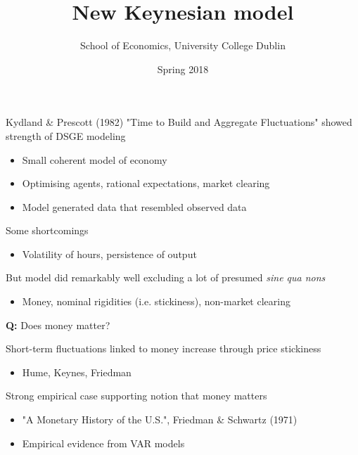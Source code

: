 \documentclass{beamer}
\title{New Keynesian model}
\author{School of Economics, University College Dublin}
\date{Spring 2018}
\begin{document}
\begin{frame}
 \titlepage
\end{frame}

\begin{frame}
  Kydland \& Prescott (1982) "Time to Build and Aggregate Fluctuations" showed strength of DSGE modeling
  \begin{itemize}
    \item Small coherent model of economy
    \item Optimising agents, rational expectations, market clearing
    \item Model generated data that resembled observed data
  \end{itemize}
  \medskip
  Some shortcomings
  \begin{itemize}
    \item Volatility of hours, persistence of output    
  \end{itemize}
  \medskip
  But model did remarkably well excluding a lot of presumed \textit{sine qua nons}
  \begin{itemize}
    \item Money, nominal rigidities (i.e. stickiness), non-market clearing
  \end{itemize}
\end{frame}

\begin{frame}
  \textbf{Q:} Does money matter?
\end{frame}

\begin{frame}
  Short-term fluctuations linked to money increase through price stickiness 
  \begin{itemize}
    \item Hume, Keynes, Friedman
  \end{itemize}
  \medskip
  Strong empirical case supporting notion that money matters
  \begin{itemize}
    \item "A Monetary History of the U.S.", Friedman \& Schwartz (1971)
    \item Empirical evidence from VAR models
  \end{itemize}
\end{frame}
\end{document}
